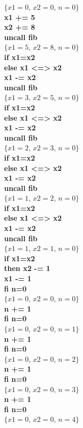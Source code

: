 \documentclass[12pt]{report}
\begin{document}
$ \{x1=0$, $x2=0$, $n=0 \} $ \\
\textbf{ x1 += 5 } \\
\textbf{ x2 += 8 } \\
\textbf{ uncall fib } \\
$ \{x1=5$, $x2=8$, $n=0 \} $ \\
\textbf{if x1=x2} \\
\textbf{else x1 <=> x2} \\
\textbf{x1 -= x2} \\
\textbf{uncall fib} \\
$ \{x1=3$, $x2=5$, $n=0 \} $ \\
\textbf{if x1=x2} \\
\textbf{else x1 <=> x2} \\
\textbf{x1 -= x2} \\
\textbf{uncall fib} \\
$ \{x1=2$, $x2=3$, $n=0 \} $ \\
\textbf{if x1=x2} \\
\textbf{else x1 <=> x2} \\
\textbf{x1 -= x2} \\
\textbf{uncall fib} \\
$ \{x1=1$, $x2=2$, $n=0 \} $ \\
\textbf{if x1=x2} \\
\textbf{else x1 <=> x2} \\
\textbf{x1 -= x2} \\
\textbf{uncall fib} \\
$ \{x1=1$, $x2=1$, $n=0 \} $ \\
\textbf{if x1=x2} \\
\textbf{then x2 -= 1} \\
\textbf{x1 -= 1} \\
\textbf{fi n=0} \\
$ \{x1=0$, $x2=0$, $n=0 \} $ \\
\textbf{n += 1} \\
\textbf{ fi n=0 } \\
$ \{x1=0$, $x2=0$, $n=1 \} $ \\
\textbf{ n += 1} \\
\textbf{ fi n=0 } \\
$ \{x1=0$, $x2=0$, $n=2 \} $ \\
\textbf{ n += 1} \\
\textbf{ fi n=0 } \\
$ \{x1=0$, $x2=0$, $n=3 \} $ \\
\textbf{ n += 1} \\
\textbf{ fi n=0 } \\
$ \{x1=0$, $x2=0$, $n=4 \} $ \\
\end{document}
